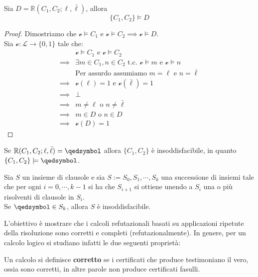 \begin{lemn}
\label{lem:correttezza-risoluzione}
        Sia $D = \mathbb{R}(C_1, C_2; \ell, \bar{\ell})$, allora 
        $$
        \{C_1, C_2\} \models D
        $$
\end{lemn}

\begin{proof}
Dimostriamo che $\mathcal{v} \models C_1$ e $\mathcal{v} \models C_2 \implies \mathscr{v} \models D$. \\
Sia $\mathcal{v} : \mathscr{L} \rightarrow \{0, 1\}$ tale che:
  \begin{align*}
    & \mathcal{v} \models C_1 \text{ e } \mathcal{v} \models C_2 \\
    \implies & \exists m \in C_1, n \in C_2 \text{ t.c. } \mathcal{v} \models m \text{ e } \mathcal{v} \models n \\
    & \text{Per assurdo assumiamo } m = \ell \text{ e } n = \bar \ell \\
    \implies & \mathcal{v}(\ell) = 1 \text{ e } \mathcal{v}(\bar \ell) =1 \\
    \implies & \bot \\
    \implies & m \neq \ell \text{ o } n \neq \bar \ell \\
    \implies &  m \in D \text{ o } n \in D \\
    \implies & \mathcal{v}(D) = 1
  \end{align*}
\end{proof}

\begin{cor}
        Se $\mathbb{R}(C_1, C_2; \ell, \bar{\ell}) = \qedsymbol$ allora 
        $\{C_1, C_2\}$ è insoddisfacibile, in quanto $\{C_1, C_2\} \models \qedsymbol$.
\end{cor}
\begin{defi}
  Sia $S$ un insieme di clausole e sia $S := S_0, S_1, \cdots, S_k$ una successione di insiemi tale che per ogni $i = 0, \cdots, k-1$ si ha che $S_{i+1}$ si ottiene unendo a $S_i$ una o più risolventi di clausole in $S_i$. \\
  Se $\qedsymbol \in S_k$, allora $S$ è insoddisfacibile.
\end{defi}
L'obiettivo è mostrare che i calcoli refutazionali basati su applicazioni 
ripetute della risoluzione sono corretti e completi (refutazionalmente).
In genere, per un calcolo logico si studiano infatti le due
seguenti proprietà:
\begin{defi}[Correttezza]
        Un calcolo si definisce \textbf{corretto} se i certificati che produce 
        testimoniano il vero, ossia sono corretti, in altre parole 
        non produce certificati fasulli. 
\end{defi}

